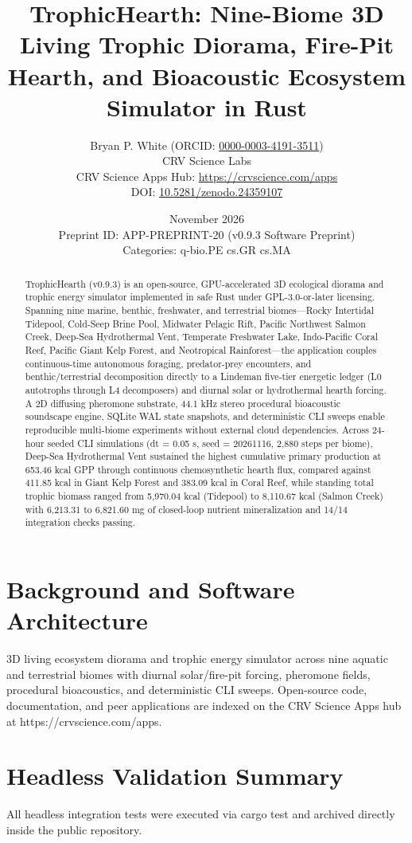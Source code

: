 \documentclass[10pt,letterpaper]{article}
\title{\textbf{TrophicHearth: Nine-Biome 3D Living Trophic Diorama, Fire-Pit Hearth, and Bioacoustic Ecosystem Simulator in Rust}}
\author{Bryan P. White (ORCID: \href{https://orcid.org/0000-0003-4191-3511}{0000-0003-4191-3511}) \\ CRV Science Labs \\ \small CRV Science Apps Hub: \url{https://crvscience.com/apps} \\ \small DOI: \href{https://doi.org/10.5281/zenodo.24359107}{10.5281/zenodo.24359107}}
\date{November 2026 \\ \small Preprint ID: APP-PREPRINT-20 (v0.9.3 Software Preprint) \\ \small Categories: q-bio.PE \textbullet{} cs.GR \textbullet{} cs.MA}
\begin{document}
\maketitle

\begin{abstract}
TrophicHearth (v0.9.3) is an open-source, GPU-accelerated 3D ecological diorama and trophic energy simulator implemented in safe Rust under GPL-3.0-or-later licensing. Spanning nine marine, benthic, freshwater, and terrestrial biomes---Rocky Intertidal Tidepool, Cold-Seep Brine Pool, Midwater Pelagic Rift, Pacific Northwest Salmon Creek, Deep-Sea Hydrothermal Vent, Temperate Freshwater Lake, Indo-Pacific Coral Reef, Pacific Giant Kelp Forest, and Neotropical Rainforest---the application couples continuous-time autonomous foraging, predator-prey encounters, and benthic/terrestrial decomposition directly to a Lindeman five-tier energetic ledger (L0 autotrophs through L4 decomposers) and diurnal solar or hydrothermal hearth forcing. A 2D diffusing pheromone substrate, 44.1 kHz stereo procedural bioacoustic soundscape engine, SQLite WAL state snapshots, and deterministic CLI sweeps enable reproducible multi-biome experiments without external cloud dependencies. Across 24-hour seeded CLI simulations (dt = 0.05 s, seed = 20261116, 2,880 steps per biome), Deep-Sea Hydrothermal Vent sustained the highest cumulative primary production at 653.46 kcal GPP through continuous chemosynthetic hearth flux, compared against 411.85 kcal in Giant Kelp Forest and 383.09 kcal in Coral Reef, while standing total trophic biomass ranged from 5,970.04 kcal (Tidepool) to 8,110.67 kcal (Salmon Creek) with 6,213.31 to 6,821.60 mg of closed-loop nutrient mineralization and 14/14 integration checks passing.
\end{abstract}

\section{Background and Software Architecture}
3D living ecosystem diorama and trophic energy simulator across nine aquatic and terrestrial biomes with diurnal solar/fire-pit forcing, pheromone fields, procedural bioacoustics, and deterministic CLI sweeps. Open-source code, documentation, and peer applications are indexed on the CRV Science Apps hub at https://crvscience.com/apps.

\section{Headless Validation Summary}
All headless integration tests were executed via cargo test and archived directly inside the public repository.
\end{document}

